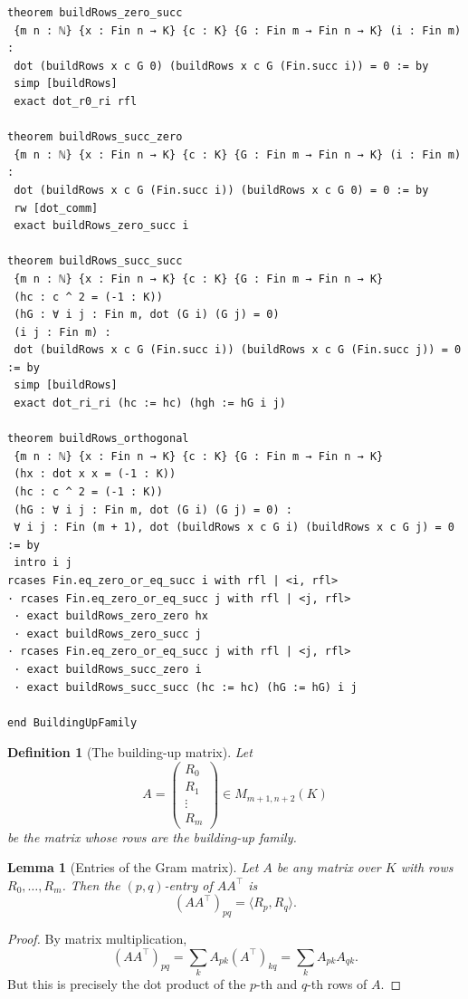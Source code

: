\documentclass[12pt]{article}
\newtheorem{defn}{Definition}[section]
\newtheorem{lemma}[theorem]{Lemma}
\begin{document}
\begin{lstlisting}[caption={Lean verification for Theorem~\ref{thm:buildrows-orth}.}]
theorem buildRows_zero_succ
 {m n : ℕ} {x : Fin n → K} {c : K} {G : Fin m → Fin n → K} (i : Fin m) :
 dot (buildRows x c G 0) (buildRows x c G (Fin.succ i)) = 0 := by
 simp [buildRows]
 exact dot_r0_ri rfl

theorem buildRows_succ_zero
 {m n : ℕ} {x : Fin n → K} {c : K} {G : Fin m → Fin n → K} (i : Fin m) :
 dot (buildRows x c G (Fin.succ i)) (buildRows x c G 0) = 0 := by
 rw [dot_comm]
 exact buildRows_zero_succ i

theorem buildRows_succ_succ
 {m n : ℕ} {x : Fin n → K} {c : K} {G : Fin m → Fin n → K}
 (hc : c ^ 2 = (-1 : K))
 (hG : ∀ i j : Fin m, dot (G i) (G j) = 0)
 (i j : Fin m) :
 dot (buildRows x c G (Fin.succ i)) (buildRows x c G (Fin.succ j)) = 0 := by
 simp [buildRows]
 exact dot_ri_ri (hc := hc) (hgh := hG i j)

theorem buildRows_orthogonal
 {m n : ℕ} {x : Fin n → K} {c : K} {G : Fin m → Fin n → K}
 (hx : dot x x = (-1 : K))
 (hc : c ^ 2 = (-1 : K))
 (hG : ∀ i j : Fin m, dot (G i) (G j) = 0) :
 ∀ i j : Fin (m + 1), dot (buildRows x c G i) (buildRows x c G j) = 0 := by
 intro i j
rcases Fin.eq_zero_or_eq_succ i with rfl | <i, rfl>
· rcases Fin.eq_zero_or_eq_succ j with rfl | <j, rfl>
 · exact buildRows_zero_zero hx
 · exact buildRows_zero_succ j
· rcases Fin.eq_zero_or_eq_succ j with rfl | <j, rfl>
 · exact buildRows_succ_zero i
 · exact buildRows_succ_succ (hc := hc) (hG := hG) i j

end BuildingUpFamily
\end{lstlisting}

\begin{defn}[The building-up matrix]
\label{def:buildrows-matrix}
Let
\[
A=
\begin{pmatrix}
R_0\\
R_1\\
\vdots\\
R_m
\end{pmatrix}
\in M_{m+1,n+2}(K)
\]
be the matrix whose rows are the building-up family.
\end{defn}

\begin{lemma}[Entries of the Gram matrix]
\label{lem:gram-entry-dot}
Let $A$ be any matrix over $K$ with rows $R_0,\dots,R_m$. Then the $(p,q)$-entry of $AA^\top$ is
\[
(AA^\top)_{pq} = \langle R_p,R_q\rangle.
\]
\end{lemma}

\begin{proof}
By matrix multiplication,
\[
(AA^\top)_{pq}
=
\sum_k A_{pk}(A^\top)_{kq}
=
\sum_k A_{pk}A_{qk}.
\]
But this is precisely the dot product of the $p$-th and $q$-th rows of $A$. 
\end{proof}
\end{document}
